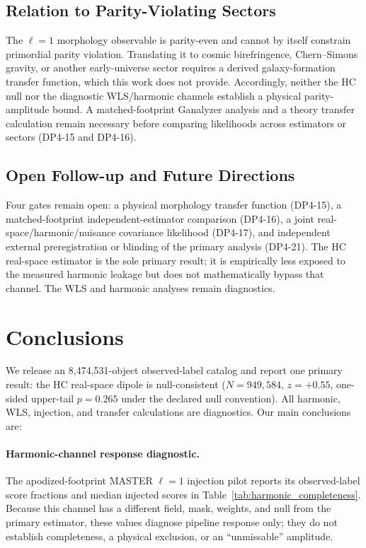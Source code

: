 \documentclass[aps,prd,twocolumn,superscriptaddress,preprintnumbers,nofootinbib,longbibliography,floatfix]{revtex4-2}
\begin{document}
\subsection{Relation to Parity-Violating Sectors}
\label{sec:parity_translation}

The $\ell=1$ morphology observable is parity-even and cannot by itself constrain primordial parity violation. Translating it to cosmic birefringence, Chern--Simons gravity, or another early-universe sector requires a derived galaxy-formation transfer function, which this work does not provide. Accordingly, neither the HC null nor the diagnostic WLS/harmonic channels establish a physical parity-amplitude bound. A matched-footprint Ganalyzer analysis and a theory transfer calculation remain necessary before comparing likelihoods across estimators or sectors (DP4-15 and DP4-16).

\subsection{Open Follow-up and Future Directions}

Four gates remain open: a physical morphology transfer function (DP4-15), a matched-footprint independent-estimator comparison (DP4-16), a joint real-space/harmonic/nuisance covariance likelihood (DP4-17), and independent external preregistration or blinding of the primary analysis (DP4-21). The HC real-space estimator is the sole primary result; it is empirically less exposed to the measured harmonic leakage but does not mathematically bypass that channel. The WLS and harmonic analyses remain diagnostics.

\section{Conclusions}
\label{sec:conclusions}

We release an 8,474,531-object observed-label catalog and report one primary result: the HC real-space dipole is null-consistent ($N=949{,}584$, $z=+0.55$, one-sided upper-tail $p=0.265$ under the declared null convention). All harmonic, WLS, injection, and transfer calculations are diagnostics. Our main conclusions are:

\paragraph{Harmonic-channel response diagnostic.}
The apodized-footprint MASTER $\ell=1$ injection pilot reports its observed-label score fractions and median injected scores in Table~\ref{tab:harmonic_completeness}. Because this channel has a different field, mask, weights, and null from the primary estimator, these values diagnose pipeline response only; they do not establish completeness, a physical exclusion, or an ``unmissable'' amplitude.
\end{document}
